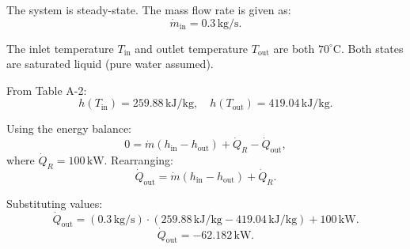 The system is steady-state.  
The mass flow rate is given as:  
\[
\dot{m}_{\text{in}} = 0.3 \, \text{kg/s}.
\]  

The inlet temperature \( T_{\text{in}} \) and outlet temperature \( T_{\text{out}} \) are both \( 70^\circ\text{C} \). Both states are saturated liquid (pure water assumed).  

From Table A-2:  
\[
h(T_{\text{in}}) = 259.88 \, \text{kJ/kg}, \quad h(T_{\text{out}}) = 419.04 \, \text{kJ/kg}.
\]  

Using the energy balance:  
\[
0 = \dot{m} (h_{\text{in}} - h_{\text{out}}) + \dot{Q}_R - \dot{Q}_{\text{out}},
\]  
where \( \dot{Q}_R = 100 \, \text{kW} \). Rearranging:  
\[
\dot{Q}_{\text{out}} = \dot{m} (h_{\text{in}} - h_{\text{out}}) + \dot{Q}_R.
\]  

Substituting values:  
\[
\dot{Q}_{\text{out}} = (0.3 \, \text{kg/s}) \cdot (259.88 \, \text{kJ/kg} - 419.04 \, \text{kJ/kg}) + 100 \, \text{kW}.
\]  
\[
\dot{Q}_{\text{out}} = -62.182 \, \text{kW}.
\]